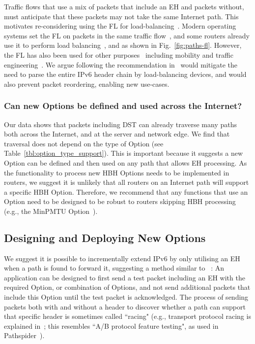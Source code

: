 \documentclass[conference]{IEEEtran}
\begin{document}
Traffic flows that use a mix of packets that include an EH and packets without, must anticipate that these packets may not take the same Internet path.
This motivates re-considering using the FL for load-balancing~\cite{RFC6437}. Modern operating systems set the FL on packets in the same traffic flow~\cite{os-fl}, and some routers already use it to perform load balancing~\cite{lb-classification}, and as shown in Fig.~\ref{fig:paths-fl}. However, the FL has also been used for other purposes~\cite{flow-label-approaches} including mobility and traffic engineering~\cite{traffic-eng}. We argue following the recommendation in~\cite{RFC6437} would mitigate the need to parse the entire IPv6 header chain by load-balancing devices, and would also prevent packet reordering, enabling new use-cases. 


\subsubsection{Can new Options be defined and used across the Internet?}
Our  data  shows that packets including DST can already traverse many paths both across the Internet, and at the server and network edge. 
We find that traversal does not depend on the type of Option  (see Table~\ref{tbl:option_type_support}). This is important because it suggests a new Option can be defined and then used on any path that allows EH processing. 
As the functionality to process new HBH Options needs to be implemented in routers, we suggest it is unlikely that all routers on an Internet path will support a specific HBH Option. Therefore, we recommend that any functions that use an Option need to be designed to be robust to routers skipping HBH processing (e.g., the MinPMTU  Option~\cite{rfc9268,rfc9343}).


\subsection{Designing and Deploying New Options}

We suggest it is possible to incrementally extend IPv6 by only utilising an EH when a path is found to forward it,
suggesting a method similar to ~\cite{rfc9268}:
An application can be designed to first send a test packet including an EH with the required Option, or combination of Options, and not send additional packets that include this Option until the test packet is acknowledged. The process of sending packets both with and without a header to discover whether a path can support that specific header is sometimes called ``racing" (e.g., transport protocol racing is explained in~\cite{ietf-taps-arch-18}; this resembles ``A/B protocol feature testing", as used in Pathspider~\cite{learmonth2016pathspider}).
\end{document}
